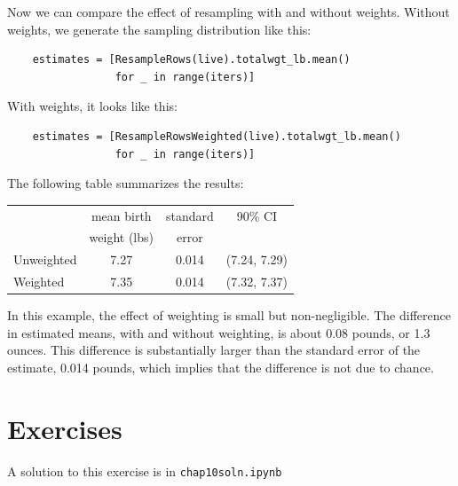 \documentclass[12pt]{book}
\begin{document}
Now we can compare the effect of resampling with and without
weights.  Without weights, we generate the sampling distribution
like this:

\begin{verbatim}
    estimates = [ResampleRows(live).totalwgt_lb.mean()
                 for _ in range(iters)]
\end{verbatim}

With weights, it looks like this:

\begin{verbatim}
    estimates = [ResampleRowsWeighted(live).totalwgt_lb.mean()
                 for _ in range(iters)]
\end{verbatim}

The following table summarizes the results:

\begin{center}
\begin{tabular}{|l|c|c|c|}
\hline
                    &  mean birth   & standard  &  90\% CI  \\ 
                    &  weight (lbs) & error     &           \\ 
\hline
Unweighted          &  7.27  &  0.014  &  (7.24, 7.29)  \\ 
Weighted            &  7.35  &  0.014  &  (7.32, 7.37)  \\ 
\hline
\end{tabular}
\end{center}


In this example, the effect of weighting is small but non-negligible.
The difference in estimated means, with and without weighting, is
about 0.08 pounds, or 1.3 ounces.  This difference is substantially
larger than the standard error of the estimate, 0.014 pounds, which
implies that the difference is not due to chance.


\section{Exercises}

A solution to this exercise is in \verb"chap10soln.ipynb"
\end{document}

